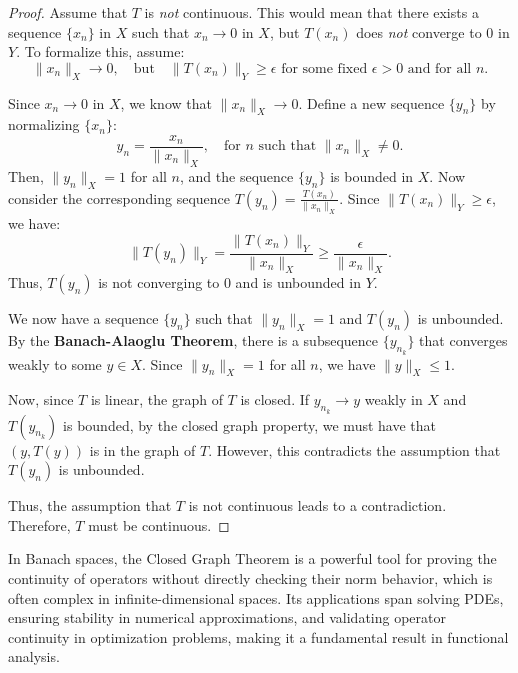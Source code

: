 \documentclass[12pt, reqno]{amsart}
\theoremstyle{definition}
\numberwithin{equation}{section}
\begin{document}
\begin{proof}
Assume that $T$ is \emph{not} continuous. This would mean that there exists a sequence $\{x_n\}$ in $X$ such that $x_n \to 0$ in $X$, but $T(x_n)$ does \emph{not} converge to $0$ in $Y$. To formalize this, assume:
\[
\|x_n\|_X \to 0, \quad \text{but} \quad \|T(x_n)\|_Y \geq \epsilon \text{ for some fixed } \epsilon > 0 \text{ and for all } n.
\]

Since $x_n \to 0$ in $X$, we know that $\|x_n\|_X \to 0$. Define a new sequence $\{y_n\}$ by normalizing $\{x_n\}$:
\[
y_n = \frac{x_n}{\|x_n\|_X}, \quad \text{for } n \text{ such that } \|x_n\|_X \neq 0.
\]
Then, $\|y_n\|_X = 1$ for all $n$, and the sequence $\{y_n\}$ is bounded in $X$. Now consider the corresponding sequence $T(y_n) = \frac{T(x_n)}{\|x_n\|_X}$. Since $\|T(x_n)\|_Y \geq \epsilon$, we have:
\[
\|T(y_n)\|_Y = \frac{\|T(x_n)\|_Y}{\|x_n\|_X} \geq \frac{\epsilon}{\|x_n\|_X}.
\]
Thus, $T(y_n)$ is not converging to $0$ and is unbounded in $Y$.

We now have a sequence $\{y_n\}$ such that $\|y_n\|_X = 1$ and $T(y_n)$ is unbounded. By the \textbf{Banach-Alaoglu Theorem}, there is a subsequence $\{y_{n_k}\}$ that converges weakly to some $y \in X$. Since $\|y_n\|_X = 1$ for all $n$, we have $\|y\|_X \leq 1$.

Now, since $T$ is linear, the graph of $T$ is closed. If $y_{n_k} \to y$ weakly in $X$ and $T(y_{n_k})$ is bounded, by the closed graph property, we must have that $(y, T(y))$ is in the graph of $T$. However, this contradicts the assumption that $T(y_n)$ is unbounded.

Thus, the assumption that $T$ is not continuous leads to a contradiction. Therefore, $T$ must be continuous.
\end{proof}

In Banach spaces, the Closed Graph Theorem is a powerful tool for proving the continuity of operators without directly checking their norm behavior, which is often complex in infinite-dimensional spaces. Its applications span solving PDEs, ensuring stability in numerical approximations, and validating operator continuity in optimization problems, making it a fundamental result in functional analysis.
\vfill
\pagebreak
\end{document}
